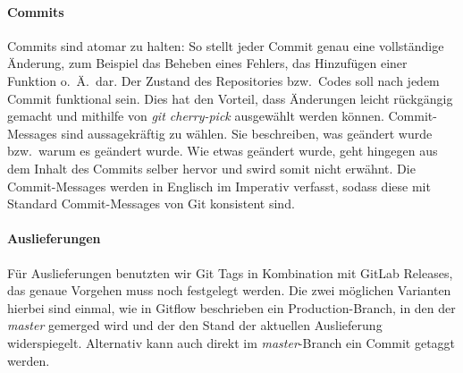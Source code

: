\paragraph{Commits}
Commits sind atomar zu halten:
So stellt jeder Commit genau eine vollständige Änderung, zum Beispiel das Beheben eines
Fehlers, das Hinzufügen einer Funktion o.\ Ä.\ dar.
Der Zustand des Repositories bzw.\ Codes soll nach jedem Commit funktional sein.
Dies hat den Vorteil, dass Änderungen leicht rückgängig gemacht und mithilfe von
\textit{git cherry-pick} ausgewählt werden können.
Commit-Messages sind aussagekräftig zu wählen.
Sie beschreiben, was geändert wurde bzw.\ warum es geändert wurde.
Wie etwas geändert wurde, geht hingegen aus dem Inhalt des Commits selber hervor und swird somit nicht
erwähnt.
Die Commit-Messages werden in Englisch im Imperativ verfasst, sodass
diese mit Standard Commit-Messages von Git konsistent sind.

\paragraph{Auslieferungen}\label{subsec:auslieferungen}
Für Auslieferungen benutzten wir Git Tags in Kombination mit GitLab Releases, das genaue Vorgehen
muss noch festgelegt werden.
Die zwei möglichen Varianten hierbei sind einmal, wie in Gitflow beschrieben ein
Production-Branch, in den der \textit{master} gemerged wird und der den Stand der aktuellen Auslieferung
widerspiegelt.
Alternativ kann auch direkt im \textit{master}-Branch ein Commit getaggt werden.
